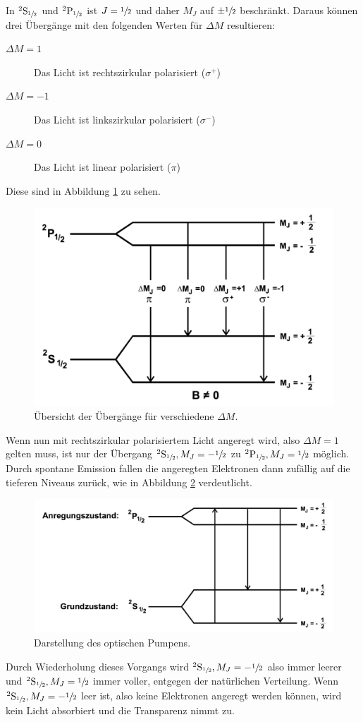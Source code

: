 In ${}^2\text{S}_{\sfrac{1}{2}}$ und ${}^2\text{P}_{\sfrac{1}{2}}$ ist $J={\sfrac{1}{2}}$ und daher $M_J$ auf $\pm \sfrac{1}{2}$ beschränkt. Daraus können drei Übergänge mit den folgenden Werten für $\Delta M$ resultieren:
\begin{description}
	\item[$\Delta M=1$] Das Licht ist rechtszirkular polarisiert ($\sigma^{+}$)
	\item[$\Delta M=-1$] Das Licht ist linkszirkular polarisiert ($\sigma^{-}$)
	\item[$\Delta M=0$] Das Licht ist linear polarisiert ($\pi$)
\end{description}
Diese sind in Abbildung \ref{fig:ubergang} zu sehen.
\begin{figure}
	\centering
	\includegraphics[width=0.8\linewidth]{img/ubergange.jpg}
	\caption{Übersicht der Übergänge für verschiedene $\Delta M$.}
	\label{fig:ubergang}
\end{figure}
Wenn nun mit rechtszirkular polarisiertem Licht angeregt wird, also $\Delta M=1$ gelten muss, ist nur der Übergang ${}^2\text{S}_{\sfrac{1}{2}}, M_J=-\sfrac{1}{2}$ zu ${}^2\text{P}_{\sfrac{1}{2}}, M_J=\sfrac{1}{2}$ möglich. Durch spontane Emission fallen die angeregten Elektronen dann zufällig auf die tieferen Niveaus zurück, wie in Abbildung \ref{fig:optPumpen} verdeutlicht.
\begin{figure}
	\centering
	\includegraphics[width=0.8\linewidth]{img/optPumpen.jpg}
	\caption{Darstellung des optischen Pumpens.\cite{V21}}
	\label{fig:optPumpen}
\end{figure}
Durch Wiederholung dieses Vorgangs wird ${}^2\text{S}_{\sfrac{1}{2}}, M_J=-\sfrac{1}{2}$ also immer leerer und ${}^2\text{S}_{\sfrac{1}{2}},M_J=\sfrac{1}{2}$ immer voller, entgegen der natürlichen Verteilung. Wenn  ${}^2\text{S}_{\sfrac{1}{2}}, M_J=-\sfrac{1}{2}$ leer ist, also keine Elektronen angeregt werden können, wird kein Licht absorbiert und die Transparenz nimmt zu.
